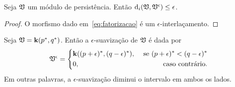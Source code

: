 \begin{propo}\label{teo:smoothing}
    Seja $\mathfrak{V}$ um módulo de persistência. Então $\text{d}_i(\mathfrak{V}, \mathfrak{V}^\epsilon) \leq 
    \epsilon$.
\end{propo}
\begin{proof}
    O morfismo dado em~\ref{eq:fatorizacao} é um $\epsilon$-interlaçamento.
\end{proof}

\begin{ex}\label{ex:int_smooth}
    Seja $\mathfrak{V} = \mathbf{k}(p^*, q^*)$. Então a $\epsilon$-suavização de $\mathfrak{V}$ 
    é dada por 
    \begin{equation*}
        \mathfrak{V}^\epsilon = 
        \left\{
        \begin{split}
            &\mathbf{k}((p+\epsilon)^*, (q-\epsilon)^*), & \text{ se } (p+\epsilon)^* < (q - \epsilon)^* \\
            & 0, & \text{ caso contrário.}
        \end{split}
        \right.
    \end{equation*}
    Em outras palavras, a $\epsilon$-suavização diminui o intervalo em ambos os lados. 
\end{ex}

